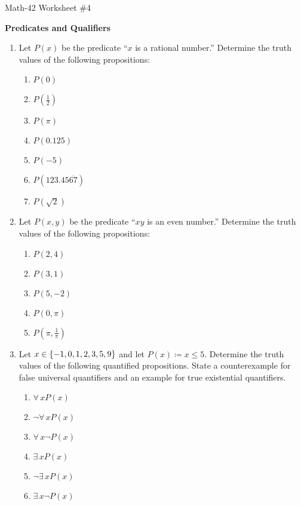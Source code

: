 \documentclass[letterpaper,12pt,fleqn]{article}
\begin{document}
\begin{center}
  \large Math-42 Worksheet \#4

  \textbf{Predicates and Qualifiers}
\end{center}

\vspace{0.5in}

\begin{enumerate}[left=0in,itemsep=0.5in]
\item Let \(P(x)\) be the predicate ``\(x\) is a rational number.''  Determine the truth values of the following
  propositions:
  \begin{enumerate}
  \item \(P(0)\)
  \item \(P\left(\frac{1}{2}\right)\)
  \item \(P(\pi)\)
  \item \(P(0.125)\)
  \item \(P(-5)\)
  \item \(P(123.45\overline{67})\)
  \item \(P(\sqrt{2})\)
  \end{enumerate}

\item Let \(P(x,y)\) be the predicate ``\(xy\) is an even number.''  Determine the truth values of the following
  propositions:
  \begin{enumerate}
    \item \(P(2, 4)\)
    \item \(P(3, 1)\)
    \item \(P(5, -2)\)
    \item \(P(0, \pi)\)
    \item \(P\left(\pi, \frac{1}{\pi}\right)\)
  \end{enumerate}

\item Let \(x\in\{-1,0,1,2,3,5,9\}\) and let \(P(x)\coloneqq x\le5\).  Determine the truth values of the following
  quantified propositions.  State a counterexample for false universal quantifiers and an example for true
  existential quantifiers.
  \begin{enumerate}
  \item \(\forall\,xP(x)\)
  \item \(\lnot\forall\,xP(x)\)
  \item \(\forall\,x\lnot P(x)\)
  \item \(\exists\,xP(x)\)
  \item \(\lnot\exists\,xP(x)\)
  \item \(\exists\,x\lnot P(x)\)
  \end{enumerate}


\end{enumerate}
\end{document}
